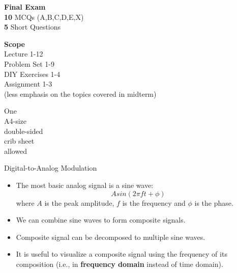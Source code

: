 \begin{cf}{
		\textbf{Final Exam}\\
		\vspace{1cm}
		\textbf{10} MCQs (A,B,C,D,E,X)\\
		\textbf{5} Short Questions
}
\end{cf}

\begin{cf}{
		\textbf{Scope}\\
		\vspace{1cm}
		Lecture 1-12\\
		Problem Set 1-9\\
		DIY Exercises 1-4\\
		Assignment 1-3\\
		\tiny{(less emphasis on the topics covered in midterm)}
}
\end{cf}

\begin{cf}{
	One\\
	A4-size\\
	double-sided\\
	crib sheet\\
	allowed
}
\end{cf}

\begin{cf}{
	Digital-to-Analog Modulation
}
\end{cf}

\begin{cf}{\small
	\begin{itemize}
	\item The most basic analog signal is a sine wave:
	\[
		A sin(2\pi ft + \phi)
	\]
	where $A$ is the peak amplitude, $f$ is the frequency and $\phi$ is the phase.
	\end{itemize}
}
\end{cf}

\begin{cf}{

}
\end{cf}

\begin{cf}{\small
	\begin{itemize}
	\item We can combine sine waves to form composite signals.
	\item Composite signal can be decomposed to multiple sine waves.
	\item It is useful to visualize a composite signal using the frequency of its composition (i.e., in \textbf{frequency domain} instead of time domain).
	\end{itemize}
}
\end{cf}

